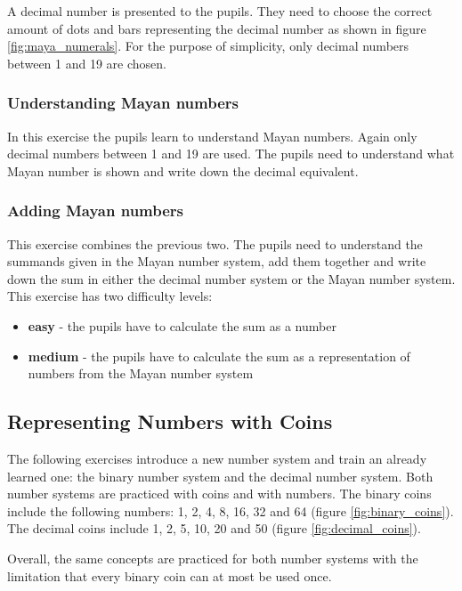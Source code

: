 A decimal number is presented to the pupils. They need to choose the correct amount of dots and bars representing the decimal number as shown in figure \ref{fig:maya_numerals}. For the purpose of simplicity, only decimal numbers between 1 and 19 are chosen.

\subsubsection*{Understanding Mayan numbers}

In this exercise the pupils learn to understand Mayan numbers. Again only decimal numbers between 1 and 19 are used. The pupils need to understand what Mayan number is shown and write down the decimal equivalent.

\subsubsection*{Adding Mayan numbers}

This exercise combines the previous two. The pupils need to understand the summands given in the Mayan number system, add them together and write down the sum in either the decimal number system or the Mayan number system. This exercise has two difficulty levels:

\begin{itemize}
  \item \textbf{easy} - the pupils have to calculate the sum as a number 
  \item \textbf{medium} - the pupils have to calculate the sum as a representation of numbers from the Mayan number system
\end{itemize}

\subsection*{Representing Numbers with Coins}

The following exercises introduce a new number system and train an already learned one: the binary number system and the decimal number system. Both number systems are practiced with coins and with numbers. The binary coins include the following numbers: 1, 2, 4, 8, 16, 32 and 64 (figure \ref{fig:binary_coins}). The decimal coins include 1, 2, 5, 10, 20 and 50 (figure \ref{fig:decimal_coins}). 

Overall, the same concepts are practiced for both number systems with the limitation that every binary coin can at most be used once.

